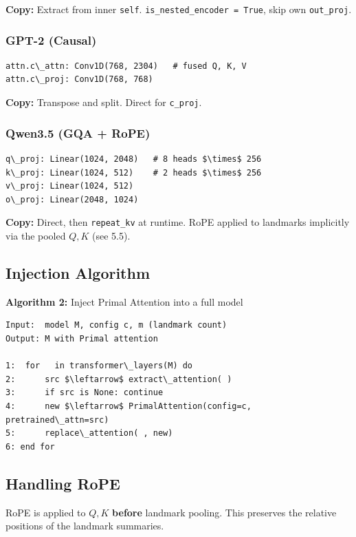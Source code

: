 \textbf{Copy:} Extract from inner \texttt{self}. \texttt{is\_nested\_encoder = True}, skip own 
\texttt{out\_proj}.

\subsubsection{GPT-2 (Causal)}

\begin{lstlisting}
attn.c\_attn: Conv1D(768, 2304)   # fused Q, K, V
attn.c\_proj: Conv1D(768, 768)
\end{lstlisting}

\textbf{Copy:} Transpose and split. Direct for \texttt{c\_proj}.

\subsubsection{Qwen3.5 (GQA + RoPE)}

\begin{lstlisting}
q\_proj: Linear(1024, 2048)   # 8 heads $\times$ 256
k\_proj: Linear(1024, 512)    # 2 heads $\times$ 256
v\_proj: Linear(1024, 512)
o\_proj: Linear(2048, 1024)
\end{lstlisting}

\textbf{Copy:} Direct, then \texttt{repeat\_kv} at runtime. RoPE applied to landmarks 
implicitly via the pooled $Q, K$ (see  5.5).

\subsection{Injection Algorithm}

\textbf{Algorithm 2:} Inject Primal Attention into a full model
\begin{lstlisting}
Input:  model M, config c, m (landmark count)
Output: M with Primal attention

1:  for   in transformer\_layers(M) do
2:      src $\leftarrow$ extract\_attention( )
3:      if src is None: continue
4:      new $\leftarrow$ PrimalAttention(config=c, pretrained\_attn=src)
5:      replace\_attention( , new)
6: end for
\end{lstlisting}

\subsection{Handling RoPE}

RoPE is applied to $Q, K$ \textbf{before} landmark pooling. This preserves the 
relative positions of the landmark summaries.


